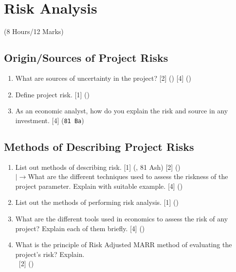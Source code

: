 \documentclass[12pt]{article}
\newcommand{\lb}{\\ $\left|\rightarrow\right.$}
\newcommand{\enter}{\\\textcolor{white}{1}}
\begin{document}
	\pagebreak
\section{Risk Analysis}
	\begin{center}(8 Hours/12 Marks)\end{center}
	\subsection{Origin/Sources of Project Risks}
		\begin{enumerate}[noitemsep, topsep=0pt]
			\item What are sources of uncertainty in the project? \hfill [2] () [4] ()

			\item Define project risk. \hfill [1] ()

			\item As an economic analyst, how do you explain the risk and source in any investment. \hfill [4] (\texttt{81 Ba})
		\end{enumerate}

	\subsection{Methods of Describing Project Risks}
		\begin{enumerate}[noitemsep, topsep=0pt]
			\item List out methods of describing risk. \hfill [1] (, 81 Ash) [2] ()
			\lb What are the different techniques used to assess the riskness of the project parameter. Explain with suitable example. \hfill [4] () 

			\item List out the methods of performing risk analysis. \hfill [1] ()

			\item What are the different tools used in economics to assess the risk of any project? Explain each of them briefly. \hfill [4] ()

			\item What is the principle of Risk Adjusted MARR method of evaluating the project's risk? Explain.
			\enter\hfill [2] ()
		\end{enumerate}
\end{document}

